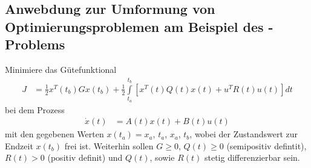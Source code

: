 \subsection{Anwebdung zur Umformung von Optimierungsproblemen am Beispiel des -Problems}
Minimiere das Gütefunktional
\begin{align*}
	J  & = \frac12 x^T(t_b)Gx(t_b)+\frac12\int\limits_{t_a}^{t_b}\left[x^T(t)Q(t)x(t)+u^TR(t)u(t)\right]dt
\end{align*}
bei dem Prozess 
\begin{align*}
	\dot{x}(t) & = A(t)x(t)+B(t)u(t)
\end{align*}
mit den gegebenen Werten $x(t_a)=x_a$, $t_a$, $x_a$, $t_b$, wobei der Zustandswert zur Endzeit $x(t_b)$ frei ist. Weiterhin sollen $G\ge 0$, $Q(t)\ge 0$ (semipositiv defintit), $R(t)>0$
(positiv definit) und $Q(t)$, sowie $R(t)$ stetig differenzierbar sein.


